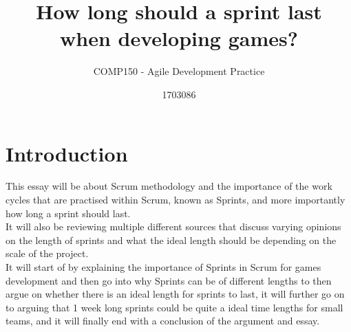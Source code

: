 \documentclass{scrartcl}
\title{How long should a sprint last\\when developing games?}
\subtitle{COMP150 - Agile Development Practice}
\author{1703086}
\begin{document}
\maketitle


\section{Introduction}
This essay will be about Scrum methodology and the importance of the work cycles that are practised within Scrum, known as Sprints, and more importantly how long a sprint should last.\\
It will also be reviewing multiple different sources that discuss varying opinions on the length of sprints and what the ideal length should be depending on the scale of the project.\\
It will start of by explaining the importance of Sprints in Scrum for games development and then go into why Sprints can be of different lengths to then argue on whether there is an ideal length for sprints to last, it will further go on to arguing that 1 week long sprints could be quite a ideal time lengths for small teams, and it will finally end with a conclusion of the argument and essay.
\end{document}
